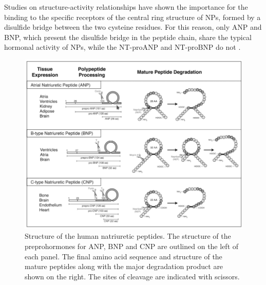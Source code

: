 \documentclass[14pt,a4paper,onecolumn]{extarticle}
\begin{document}
Studies on structure-activity relationships have shown the importance for the binding to the specific receptors of the central ring structure of NPs, formed by a disulfide bridge between the two cysteine  residues. For this reason, only ANP and BNP, which present the disulfide bridge in the peptide chain, share the typical hormonal activity of NPs, while the NT-proANP and NT-proBNP do not \citep{bib35} \citep{bib36} \citep{bib37}.



\begin{figure}      \centering      \includegraphics[scale=0.4]{../../images/NP_structure.png}      \caption{Structure of the human natriuretic peptides. The structure of the preprohormones for ANP, BNP and CNP are outlined on the left of each panel. The final amino acid sequence and structure of the mature peptides along with the major degradation product are shown on the right. The sites of cleavage are indicated with scissors.}      \label{NP_structure}  \end{figure}
\end{document}
